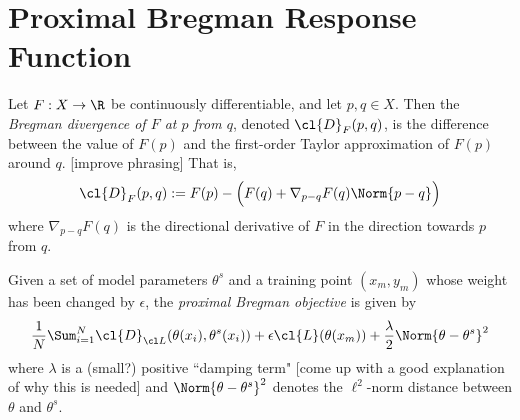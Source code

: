 \section{Proximal Bregman Response Function}
Let $F: X \to \R$ be continuously differentiable, and let $p, q \in X$. Then the \textit{Bregman divergence of $F$ at $p$ from $q$}, denoted $\cl{D}_F(p, q)$, is the difference between the value of $F(p)$ and the first-order Taylor approximation of $F(p)$ around $q$. [improve phrasing] That is, 
\begin{equation}
    \cl{D}_F(p, q) := F(p) - \Big(F(q) + \nabla_{p-q} F (q) \Norm{p-q}\Big)
\end{equation}
where $\nabla_{p-q}F(q)$ is the directional derivative of $F$ in the direction towards $p$ from $q$.

Given a set of model parameters $\theta^s$ and a training point $(x_m, y_m)$ whose weight has been changed by $\epsilon$, the \textit{proximal Bregman objective} is given by \begin{equation}
\dfrac{1}{N} \Sum_{i=1}^N \cl{D}_{\cl L}(\theta(x_i), \theta^s(x_i)) + \epsilon \cl{L}(\theta(x_m)) + \frac{\lambda}{2} \Norm{\theta-\theta^s}^2
\end{equation}
where $\lambda$ is a (small?) positive ``damping term" [come up with a good explanation of why this is needed] and $\Norm{\theta-\theta^s}^2$ denotes the $\ell^2$-norm distance between $\theta$ and $\theta^s$.